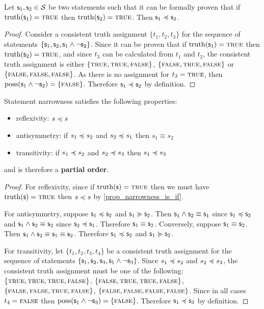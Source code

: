 \documentclass[11pt,letterpaper,fleqn]{memoir} %
\begin{document}
\begin{mathSection}
\begin{prop}\label{prop_narrowness_is_if}
	Let $\mathsf{s}_1, \mathsf{s}_2 \in \mathcal{S}$ be two statements such that it can be formally proven that if $\operatorname{truth}(\mathsf{s}_1) = \textsc{true}$ then $\operatorname{truth}(\mathsf{s}_2) = \textsc{true}$. Then $\mathsf{s}_1 \preccurlyeq \mathsf{s}_2$.
\end{prop}

\begin{proof}
	Consider a consistent truth assignment $\{t_1, t_2, t_3\}$ for the sequence of statements $\{\mathsf{s}_1, \mathsf{s}_2, \mathsf{s}_1 \wedge \neg\mathsf{s}_2\}$. Since it can be proven that if $\operatorname{truth}(\mathsf{s}_1) = \textsc{true}$ then $\operatorname{truth}(\mathsf{s}_2) = \textsc{true}$, and since $t_3$ can be calculated from $t_1$ and $t_2$, the consistent truth assignment is either $\{\textsc{true}, \textsc{true}, \textsc{false}\}$, $\{\textsc{false}, \textsc{true}, \textsc{false}\}$ or $\{\textsc{false}, \textsc{false}, \textsc{false}\}$. As there is no assignment for $t_3=\textsc{true}$, then $\operatorname{poss}(\mathsf{s}_1 \wedge \neg\mathsf{s}_2) = \{\textsc{false}\}$. Therefore $\mathsf{s}_1 \preccurlyeq \mathsf{s}_2$ by definition.
\end{proof}

\begin{prop}
	Statement narrowness satisfies the following properties:
	\begin{itemize}
		\item reflexivity: $s \preccurlyeq s$
		\item antisymmetry: if $s_1 \preccurlyeq s_2$ and  $s_2 \preccurlyeq s_1$ then $s_1 \equiv s_2$
		\item transitivity: if $s_1 \preccurlyeq s_2$ and $s_2 \preccurlyeq s_3$ then $s_1 \preccurlyeq s_3$
	\end{itemize}
	and is therefore a \textbf{partial order}.
\end{prop}
\begin{proof}
	For reflexivity, since if $\operatorname{truth}(\mathsf{s}) = \textsc{true}$ then we must have $\operatorname{truth}(\mathsf{s}) = \textsc{true}$ then $s \preccurlyeq s$ by \eqref{prop_narrowness_is_if}.
	
	For antisymmetry, suppose $\mathsf{s}_1 \preccurlyeq \mathsf{s}_2$ and $\mathsf{s}_1 \succcurlyeq \mathsf{s}_2$. Then $\mathsf{s}_1 \wedge \mathsf{s}_2 \equiv \mathsf{s}_1$ since $\mathsf{s}_1 \preccurlyeq \mathsf{s}_2$ and $\mathsf{s}_1 \wedge \mathsf{s}_2 \equiv \mathsf{s}_2$ since $\mathsf{s}_2 \preccurlyeq \mathsf{s}_1$. Therefore $\mathsf{s}_1 \equiv \mathsf{s}_2$. Conversely, suppose $\mathsf{s}_1 \equiv \mathsf{s}_2$. Then $\mathsf{s}_1 \wedge \mathsf{s}_2 \equiv \mathsf{s}_1 \equiv \mathsf{s}_2$. Therefore $\mathsf{s}_1 \preccurlyeq \mathsf{s}_2$ and $\mathsf{s}_1 \succcurlyeq \mathsf{s}_2$.
	
	For transitivity, let $\{t_1, t_2, t_3, t_4\}$ be a consistent truth assignment for the sequence of statements $\{\mathsf{s}_1, \mathsf{s}_2, \mathsf{s}_3, \mathsf{s}_1 \wedge \neg\mathsf{s}_3\}$.  Since $s_1 \preccurlyeq s_2$ and $s_2 \preccurlyeq s_3$, the consistent truth assignment must be one of the following: $\{\textsc{true}, \textsc{true}, \textsc{true}, \textsc{false}\}$, $\{\textsc{false}, \textsc{true}, \textsc{true}, \textsc{false}\}$, $\{\textsc{false}, \textsc{false}, \textsc{true}, \textsc{false}\}$, $\{\textsc{false}, \textsc{false}, \textsc{false}, \textsc{false}\}$.
	Since in all cases $t_4=\textsc{false}$ then $\operatorname{poss}(\mathsf{s}_1 \wedge \neg\mathsf{s}_3) = \{\textsc{false}\}$. Therefore $\mathsf{s}_1 \preccurlyeq \mathsf{s}_3$ by definition.
\end{proof}


\end{mathSection}
\end{document}
